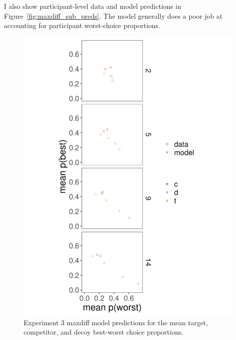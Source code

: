 I also show participant-level data and model predictions in Figure~\ref{fig:maxdiff_sub_preds}. The model generally does a poor job at accounting for participant worst-choice proportions.
\begin{figure}
   \includegraphics[width=\linewidth]{figures/maxdiff_1_means_model_v_data.jpeg}
   \caption{Experiment 3 maxdiff model predictions for the mean target, competitor, and decoy best-worst choice proportions.}
   \label{fig:maxdiff_collapsed_preds}
\end{figure}

